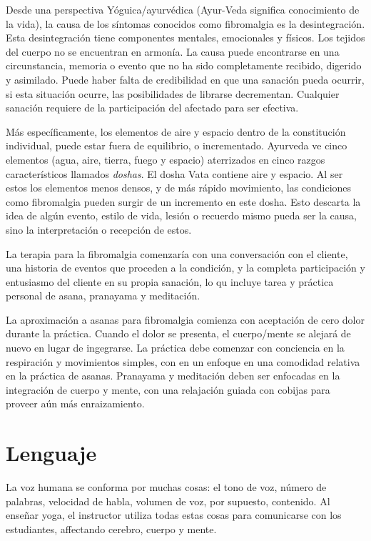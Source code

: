 Desde una perspectiva Yóguica/ayurv\'edica (Ayur-Veda significa conocimiento de la vida), la causa de los síntomas conocidos como fibromalgia es la desintegración. Esta desintegración tiene componentes mentales, emocionales y físicos. Los tejidos del cuerpo no se encuentran en armonía. La causa puede encontrarse en una circunstancia, memoria o evento que no ha sido completamente recibido, digerido y asimilado. Puede haber falta de credibilidad en que una sanación pueda ocurrir, si esta situación ocurre, las posibilidades de librarse decrementan. Cualquier sanación requiere de la participación del afectado para ser efectiva.

Más específicamente, los elementos de aire y espacio dentro de la constitución individual, puede estar fuera de equilibrio, o incrementado. Ayurveda ve cinco elementos (agua, aire, tierra, fuego y espacio) aterrizados en cinco razgos característicos llamados \textit{doshas}. El dosha Vata contiene aire y espacio. Al ser estos los elementos menos densos, y de más rápido movimiento, las condiciones como fibromalgia pueden surgir de un incremento en este dosha. Esto descarta la idea de algún evento, estilo de vida, lesión o recuerdo mismo pueda ser la causa, sino la interpretación o recepción de estos.

La terapia para la fibromalgia comenzaría con una conversación con el cliente, una historia de eventos que proceden a la condición, y la completa participación y entusiasmo del cliente en su propia sanación, lo qu incluye tarea y práctica personal de asana, pranayama y meditación.

La aproximación a asanas para fibromalgia comienza con aceptación de cero dolor durante la práctica. Cuando el dolor se presenta, el cuerpo/mente se alejará de nuevo en lugar de ingegrarse. La práctica debe comenzar con conciencia en la respiración y movimientos simples, con en un enfoque en una comodidad relativa en la práctica de asanas. Pranayama y meditación deben ser enfocadas en la integración de cuerpo y mente, con una relajación guiada con cobijas para proveer aún más enraizamiento.

\section{Lenguaje}
La voz humana se conforma por muchas cosas: el tono de voz, número de palabras, velocidad de habla, volumen de voz, por supuesto, contenido. Al enseñar yoga, el instructor utiliza todas estas cosas para comunicarse con los estudiantes, affectando cerebro, cuerpo y mente.

